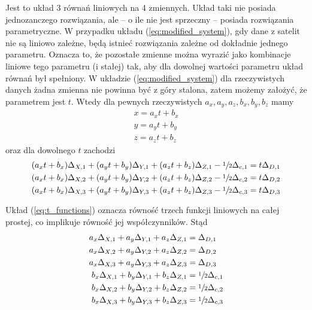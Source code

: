 \documentclass{article}
\begin{document}
Jest to układ 3 równań liniowych na 4 zmiennych. Układ taki nie posiada jednozanczego rozwiązania,
ale -- o ile nie jest sprzeczny -- posiada rozwiązania parametryczne. W przypadku układu (\ref{eq:modified_system}),
gdy dane z satelit nie są liniowo zależne, będą istnieć rozwiązania zależne od dokładnie jednego parametru.
Oznacza to, że pozostałe zmienne można wyrazić jako kombinacje liniowe tego parametru (i stałej) tak,
aby dla dowolnej wartości parametru układ równań był spełniony. W układzie (\ref{eq:modified_system}) dla rzeczywistych
danych żadna zmienna nie powinna być z góry stalona, zatem możemy założyć, że parametrem jest $t$.
Wtedy dla pewnych rzeczywistych $a_x, a_y, a_z, b_x, b_y, b_z$ mamy
\begin{equation}
\begin{aligned}
    \label{eq:x_from_t}
    x = a_xt + b_x \\
    y = a_yt + b_y \\
    z = a_zt + b_z
\end{aligned}
\end{equation}
oraz dla dowolnego $t$ zachodzi
\begin{equation}
\begin{aligned}
    \label{eq:t_functions}
    (a_xt+b_x)\Delta_{X,1} + (a_yt+b_y)\Delta_{Y,1} + (a_zt+b_z)\Delta_{Z, 1} -\sfrac{1}{2}\Delta_{c, 1} =t\Delta_{D,1} \\
    (a_xt+b_x)\Delta_{X,2} + (a_yt+b_y)\Delta_{Y,2} + (a_zt+b_z)\Delta_{Z, 2} -\sfrac{1}{2}\Delta_{c, 2} =t\Delta_{D,2} \\
    (a_xt+b_x)\Delta_{X,3} + (a_yt+b_y)\Delta_{Y,3} + (a_zt+b_z)\Delta_{Z, 3} -\sfrac{1}{2}\Delta_{c, 3} =t\Delta_{D,3}
\end{aligned}
\end{equation}

Układ (\ref{eq:t_functions}) oznacza równość trzech funkcji liniowych na całej prostej, co
implikuje równość jej współczynników. Stąd
\begin{equation}
\begin{aligned}
    a_x\Delta_{X, 1} + a_y\Delta_{Y, 1} + a_z\Delta_{Z, 1} &= \Delta_{D, 1} \\
    a_x\Delta_{X, 2} + a_y\Delta_{Y, 2} + a_z\Delta_{Z, 2} &= \Delta_{D, 2} \\
    a_x\Delta_{X, 3} + a_y\Delta_{Y, 3} + a_z\Delta_{Z, 3} &= \Delta_{D, 3} \\
    b_x\Delta_{X, 1} + b_y\Delta_{Y, 1} + b_z\Delta_{Z, 1} &= \sfrac{1}{2}\Delta_{c, 1} \\
    b_x\Delta_{X, 2} + b_y\Delta_{Y, 2} + b_z\Delta_{Z, 2} &= \sfrac{1}{2}\Delta_{c, 2} \\
    b_x\Delta_{X, 3} + b_y\Delta_{Y, 3} + b_z\Delta_{Z, 3} &= \sfrac{1}{2}\Delta_{c, 3}
\end{aligned}
\end{equation}
\end{document}
